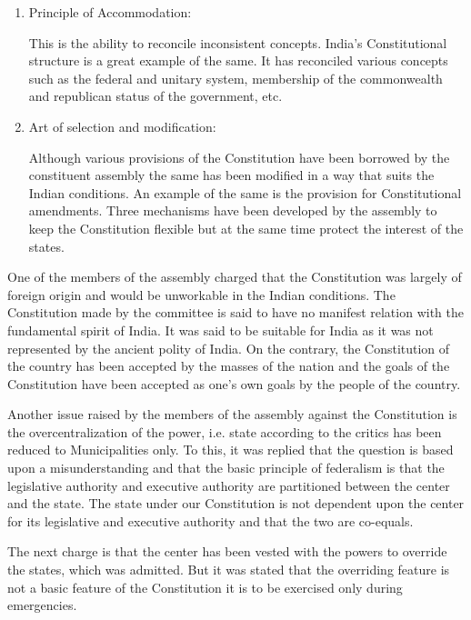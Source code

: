 \begin{multicols}{2}
\begin{enumerate}
\item Principle of Accommodation:

\noi
This is the ability to reconcile inconsistent concepts. India’s Constitutional structure is a great example of the same. It has reconciled various concepts such as the federal and unitary system, membership of the commonwealth and republican status of the government, etc.

\item Art of selection and modification:

\noi
Although various provisions of the Constitution have been borrowed by the constituent assembly the same has been modified in a way that suits the Indian conditions. An example of the same is the provision for Constitutional amendments. Three mechanisms have been developed by the assembly to keep the Constitution flexible but at the same time protect the interest of the states.
\end{enumerate}

\vspace{-.3cm}


\noi
One of the members of the assembly charged that the Constitution was largely of foreign origin and would be unworkable in the Indian conditions. The Constitution made by the committee is said to have no manifest relation with the fundamental spirit of India. It was said to be suitable for India as it was not represented by the ancient polity of India. On the contrary, the Constitution of the country has been accepted by the masses of the nation and the goals of the Constitution have been accepted as one’s own goals by the people of the country.

\noi
Another issue raised by the members of the assembly against the Constitution is the overcentralization of the power, i.e. state according to the critics has been reduced to Municipalities only. To this, it was replied that the question is based upon a misunderstanding and that the basic principle of federalism is that the legislative authority and executive authority are partitioned between the center and the state. The state under our Constitution is not dependent upon the center for its legislative and executive authority and that the two are co-equals.

\noi
The next charge is that the center has been vested with the powers to override the states, which was admitted. But it was stated that the overriding feature is not a basic feature of the Constitution it is to be exercised only during emergencies.


\end{multicols}

